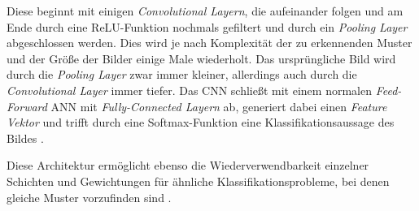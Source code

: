 Diese beginnt mit einigen \textit{Convolutional Layern}, die aufeinander folgen und am Ende durch eine ReLU-Funktion nochmals gefiltert und durch ein \textit{Pooling Layer} abgeschlossen werden. Dies wird je nach Komplexität der zu erkennenden Muster und der Größe der Bilder einige Male wiederholt. Das ursprüngliche Bild wird durch die \textit{Pooling Layer} zwar immer kleiner, allerdings auch durch die \textit{Convolutional Layer} immer tiefer. Das CNN schließt mit einem normalen \textit{Feed-Forward} ANN mit \textit{Fully-Connected Layern} ab, generiert dabei einen \textit{Feature Vektor} und trifft durch eine Softmax-Funktion eine Klassifikationsaussage des Bildes \cite{AurelienGeron.2018}. 

Diese Architektur ermöglicht ebenso die Wiederverwendbarkeit einzelner Schichten und Gewichtungen für ähnliche Klassifikationsprobleme, bei denen gleiche Muster vorzufinden sind \cite{AurelienGeron.2018}.